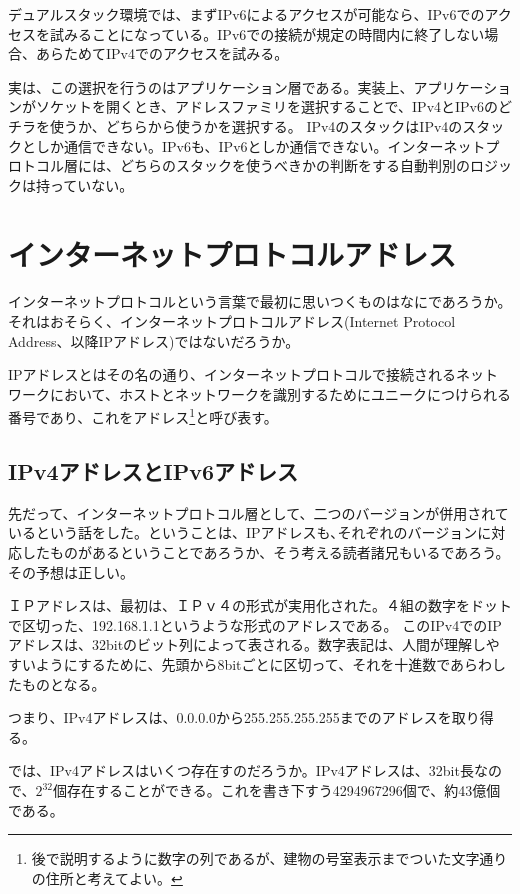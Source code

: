 デュアルスタック環境では、まずIPv6によるアクセスが可能なら、IPv6でのアクセスを試みることになっている。IPv6での接続が規定の時間内に終了しない場合、あらためてIPv4でのアクセスを試みる。

実は、この選択を行うのはアプリケーション層である。実装上、アプリケーションがソケットを開くとき、アドレスファミリを選択することで、IPv4とIPv6のどチラを使うか、どちらから使うかを選択する。
IPv4のスタックはIPv4のスタックとしか通信できない。IPv6も、IPv6としか通信できない。インターネットプロトコル層には、どちらのスタックを使うべきかの判断をする自動判別のロジックは持っていない。


\section{インターネットプロトコルアドレス}

インターネットプロトコルという言葉で最初に思いつくものはなにであろうか。それはおそらく、インターネットプロトコルアドレス(Internet Protocol Address、以降IPアドレス)ではないだろうか。

IPアドレスとはその名の通り、インターネットプロトコルで接続されるネットワークにおいて、ホストとネットワークを識別するためにユニークにつけられる番号であり、これをアドレス\footnote{後で説明するように数字の列であるが、建物の号室表示までついた文字通りの住所と考えてよい。}と呼び表す。

\subsection{IPv4アドレスとIPv6アドレス}

先だって、インターネットプロトコル層として、二つのバージョンが併用されているという話をした。ということは、IPアドレスも､それぞれのバージョンに対応したものがあるということであろうか、そう考える読者諸兄もいるであろう。その予想は正しい。

ＩＰアドレスは、最初は、ＩＰｖ４の形式が実用化された。４組の数字をドットで区切った、192.168.1.1というような形式のアドレスである。
このIPv4でのIPアドレスは、32bitのビット列によって表される。数字表記は、人間が理解しやすいようにするために、先頭から8bitごとに区切って、それを十進数であらわしたものとなる。

つまり、IPv4アドレスは、0.0.0.0から255.255.255.255までのアドレスを取り得る。

では、IPv4アドレスはいくつ存在すのだろうか。IPv4アドレスは、32bit長なので、$2^{32}$個存在することができる。これを書き下すう4294967296個で、約43億個である。

